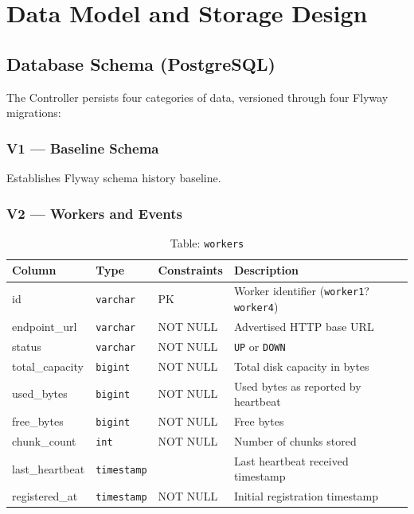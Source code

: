 \documentclass[12pt,a4paper]{report}
\begin{document}
\chapter{Data Model and Storage Design}

\section{Database Schema (PostgreSQL)}

The Controller persists four categories of data, versioned through four Flyway migrations:

\subsection{V1 --- Baseline Schema}
Establishes Flyway schema history baseline.

\subsection{V2 --- Workers and Events}

\begin{table}[H]
  \centering
  \caption{Table: \texttt{workers}}
  \label{tab:workers}
  \begin{tabular}{llll}
    \toprule
    \textbf{Column} & \textbf{Type} & \textbf{Constraints} & \textbf{Description} \\
    \midrule
    id               & \texttt{varchar}   & PK           & Worker identifier (\texttt{worker1}?\texttt{worker4}) \\
    endpoint\_url    & \texttt{varchar}   & NOT NULL     & Advertised HTTP base URL \\
    status           & \texttt{varchar}   & NOT NULL     & \texttt{UP} or \texttt{DOWN} \\
    total\_capacity  & \texttt{bigint}    & NOT NULL     & Total disk capacity in bytes \\
    used\_bytes      & \texttt{bigint}    & NOT NULL     & Used bytes as reported by heartbeat \\
    free\_bytes      & \texttt{bigint}    & NOT NULL     & Free bytes \\
    chunk\_count     & \texttt{int}       & NOT NULL     & Number of chunks stored \\
    last\_heartbeat  & \texttt{timestamp} &              & Last heartbeat received timestamp \\
    registered\_at  & \texttt{timestamp} & NOT NULL     & Initial registration timestamp \\
    \bottomrule
  \end{tabular}
\end{table}
\end{document}
